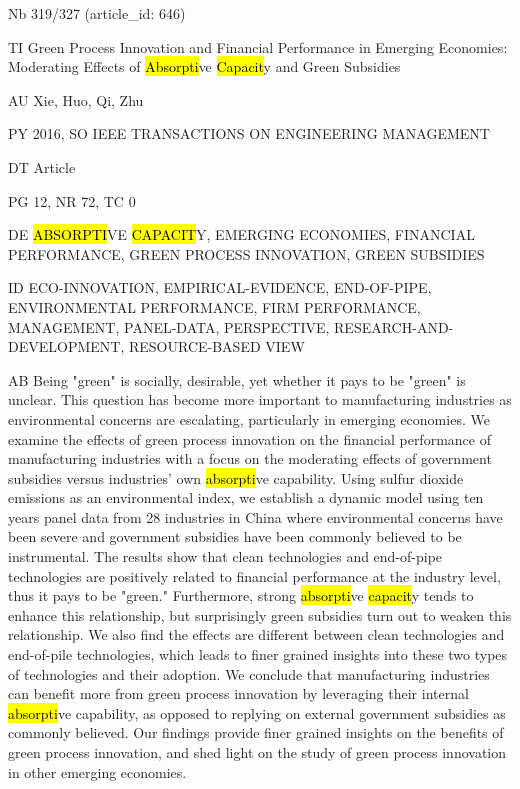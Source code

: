 \documentclass[a4paper]{article}
\begin{document}
\vspace*{-2cm}
Nb \tabto{0cm}319/327 (article\_id: 646)\par
TI \tabto{0cm}Green Process Innovation and Financial Performance in Emerging Economies: Moderating Effects of \hl{Absorpti}ve \hl{Capacit}y and Green Subsidies\par
AU \tabto{0cm}Xie, Huo, Qi, Zhu\par
PY \tabto{0cm}2016, SO IEEE TRANSACTIONS ON ENGINEERING MANAGEMENT\par
DT \tabto{0cm}Article\par
PG \tabto{0cm}12, NR 72, TC 0\par
DE \tabto{0cm}\hl{ABSORPTI}VE \hl{CAPACIT}Y, EMERGING ECONOMIES, FINANCIAL PERFORMANCE, GREEN PROCESS INNOVATION, GREEN SUBSIDIES\par
ID \tabto{0cm}ECO-INNOVATION, EMPIRICAL-EVIDENCE, END-OF-PIPE, ENVIRONMENTAL PERFORMANCE, FIRM PERFORMANCE, MANAGEMENT, PANEL-DATA, PERSPECTIVE, RESEARCH-AND-DEVELOPMENT, RESOURCE-BASED VIEW\par
AB \tabto{0cm}Being "green" is socially, desirable, yet whether it pays to be "green" is unclear. This question has become more important to manufacturing industries as environmental concerns are escalating, particularly in emerging economies. We examine the effects of green process innovation on the financial performance of manufacturing industries with a focus on the moderating effects of government subsidies versus industries' own \hl{absorpti}ve capability. Using sulfur dioxide emissions as an environmental index, we establish a dynamic model using ten years panel data from 28 industries in China where environmental concerns have been severe and government subsidies have been commonly believed to be instrumental. The results show that clean technologies and end-of-pipe technologies are positively related to financial performance at the industry level, thus it pays to be "green." Furthermore, strong \hl{absorpti}ve \hl{capacit}y tends to enhance this relationship, but surprisingly green subsidies turn out to weaken this relationship. We also find the effects are different between clean technologies and end-of-pile technologies, which leads to finer grained insights into these two types of technologies and their adoption. We conclude that manufacturing industries can benefit more from green process innovation by leveraging their internal \hl{absorpti}ve capability, as opposed to replying on external government subsidies as commonly believed. Our findings provide finer grained insights on the benefits of green process innovation, and shed light on the study of green process innovation in other emerging economies.\par
\clearpage
\end{document}
